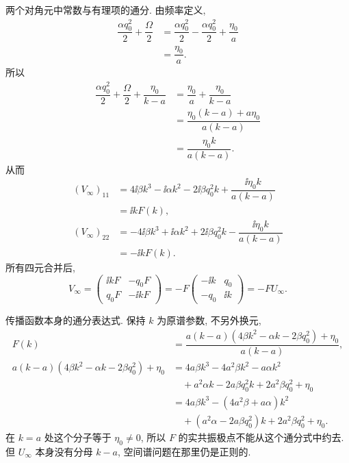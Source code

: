 \par\smallskip\noindent 两个对角元中常数与有理项的通分.\quad
由频率定义,
\begin{align*}
\dfrac{\alpha q_0^2}{2}+\dfrac{\Omega}{2}
&=\dfrac{\alpha q_0^2}{2}
-\dfrac{\alpha q_0^2}{2}+\dfrac{\eta_0}{a}\\
&=\dfrac{\eta_0}{a}.
\end{align*}
所以
\begin{align*}
\dfrac{\alpha q_0^2}{2}+\dfrac{\Omega}{2}
+\dfrac{\eta_0}{k-a}
&=\dfrac{\eta_0}{a}+\dfrac{\eta_0}{k-a}\\
&=\dfrac{\eta_0(k-a)+a\eta_0}{a(k-a)}\\
&=\dfrac{\eta_0k}{a(k-a)}.
\end{align*}
从而
\begin{align*}
(V_\infty)_{11}
&=4\ii\beta k^3-\ii\alpha k^2-2\ii\beta q_0^2k
+\dfrac{\ii\eta_0k}{a(k-a)}\\
&=\ii kF(k),\\
(V_\infty)_{22}
&=-4\ii\beta k^3+\ii\alpha k^2+2\ii\beta q_0^2k
-\dfrac{\ii\eta_0k}{a(k-a)}\\
&=-\ii kF(k).
\end{align*}
所有四元合并后,
\begin{equation*}
V_\infty=
\begin{pmatrix}\ii kF&-q_0F\\q_0F&-\ii kF\end{pmatrix}
=-F\begin{pmatrix}-\ii k&q_0\\-q_0&\ii k\end{pmatrix}
=-FU_\infty.
\end{equation*}
\par\smallskip\noindent 传播函数本身的通分表达式.\quad
保持 $k$ 为原谱参数, 不另外换元,
\begin{align*}
F(k)
&=\dfrac{a(k-a)(4\beta k^2-\alpha k-2\beta q_0^2)+\eta_0}
{a(k-a)},\\
a(k-a)(4\beta k^2-\alpha k-2\beta q_0^2)+\eta_0
&=4a\beta k^3-4a^2\beta k^2-a\alpha k^2\\
&\quad+a^2\alpha k-2a\beta q_0^2k
+2a^2\beta q_0^2+\eta_0\\
&=4a\beta k^3-(4a^2\beta+a\alpha)k^2\\
&\quad+(a^2\alpha-2a\beta q_0^2)k
+2a^2\beta q_0^2+\eta_0.
\end{align*}
在 $k=a$ 处这个分子等于 $\eta_0\ne0$, 所以 $F$ 的实共振极点不能从这个通分式中约去. 但 $U_\infty$ 本身没有分母 $k-a$, 空间谱问题在那里仍是正则的.

